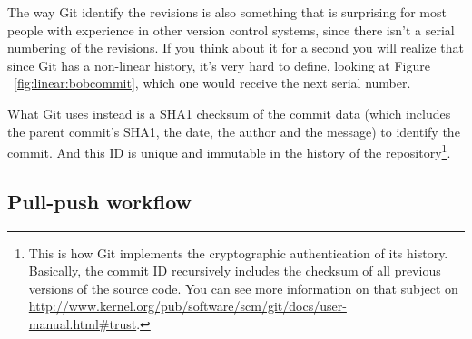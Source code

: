\begin{frame}[fragile]
{\begin{figure}[p]
\begin{center}
{          %
        }%
      \end{center}%
    \end{figure}%
  }%


\end{frame}

The way Git identify the revisions is also something that is
surprising for most people with experience in other version control
systems, since there isn't a serial numbering of the revisions.
If you think about it for a second you will realize that since Git
has a non-linear history, it's very hard to
define, looking at Figure ~\ref{fig:linear:bobcommit}, which one would
receive the next serial number.

What Git uses instead is a SHA1 checksum of the commit data (which
includes the parent commit's SHA1, the date, the author and the message)
to identify the commit. And this ID is unique and immutable in the
history of the repository\footnote{This is how Git implements the
  cryptographic authentication of its history. Basically, the commit
  ID recursively includes the checksum of all previous versions of
  the source code.  You can see more information on that subject on
  \url{http://www.kernel.org/pub/software/scm/git/docs/user-manual.html\#trust}.}.

\subsection{Pull-push workflow}

